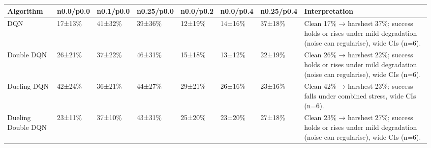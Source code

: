 \begin{tabular}{llllllll}
\toprule
Algorithm & n0.0/p0.0 & n0.1/p0.0 & n0.25/p0.0 & n0.0/p0.2 & n0.0/p0.4 & n0.25/p0.4 & Interpretation \\
\midrule
DQN & 17±13\% & 41±32\% & 39±36\% & 12±19\% & 14±16\% & 37±18\% & Clean 17\% → harshest 37\%; success holds or rises under mild degradation (noise can regularise), wide CIs (n=6). \\
Double DQN & 26±21\% & 37±22\% & 46±31\% & 15±18\% & 13±12\% & 22±19\% & Clean 26\% → harshest 22\%; success holds or rises under mild degradation (noise can regularise), wide CIs (n=6). \\
Dueling DQN & 42±24\% & 36±21\% & 44±27\% & 29±21\% & 26±16\% & 23±16\% & Clean 42\% → harshest 23\%; success falls under combined stress, wide CIs (n=6). \\
Dueling Double DQN & 23±11\% & 37±10\% & 43±31\% & 25±20\% & 23±20\% & 27±18\% & Clean 23\% → harshest 27\%; success holds or rises under mild degradation (noise can regularise), wide CIs (n=6). \\
\bottomrule
\end{tabular}
